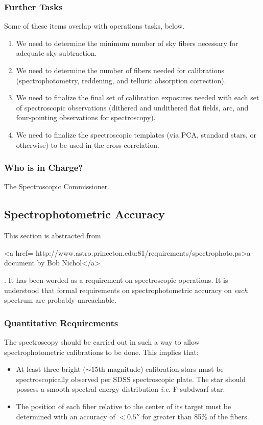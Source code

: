 \subsubsection{Further Tasks}
Some of these items overlap with operations tasks, below. 
\begin{enumerate} 
\item We need to determine the minimum number of sky fibers necessary
for adequate sky subtraction.  
\item We need to determine the number of fibers needed for
calibrations (spectrophotometry, reddening, and telluric absorption
correction). 
\item We need to finalize the final set of calibration exposures
needed with each set of spectroscopic observations (dithered and
undithered flat fields, arc, and four-pointing observations for
spectroscopy). 
\item We need to finalize the spectroscopic templates (via PCA,
standard stars, or otherwise) to be used in the cross-correlation. 
\end{enumerate}
\subsubsection{Who is in Charge?}
The Spectroscopic Commissioner. 

\subsection{Spectrophotometric Accuracy}
This section is abstracted from 
\begin{rawhtml}
<a href=
http://www.astro.princeton.edu:81/requirements/spectrophoto.ps>a document by Bob Nichol</a>\end{rawhtml}. 
It has been worded as a requirement on spectroscopic operations.  It
is understood that formal requirements on spectrophotometric accuracy
on {\em each} spectrum are probably unreachable. 

\subsubsection{Quantitative Requirements}
\label{sec:require}

The spectroscopy should be carried out in such a way to allow
spectrophotometric calibrations to be done.  This implies that:
\begin{itemize} 
\item At least three bright ($\sim15$th magnitude) calibration stars must be
spectroscopically observed per SDSS spectroscopic plate. The star
should possess a smooth spectral energy distribution {\it i.e.} F
subdwarf star.
\item The position of each fiber relative to the center of its
target must be determined with an accuracy of $< 0.5''$ for greater
than 85\% of the fibers. 
\end{itemize}


